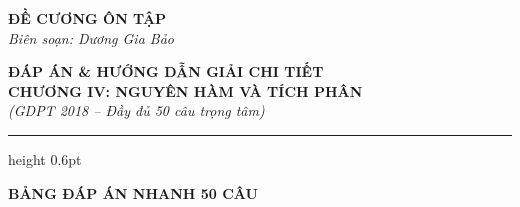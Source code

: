 \documentclass[12pt,a4paper]{article}
\begin{document}
\thispagestyle{firstpage}

\noindent
\begin{minipage}[t]{0.36\textwidth}
    \centering
    {\fontsize{12}{14}\selectfont\textbf{ĐỀ CƯƠNG ÔN TẬP}}\\[4pt]
    \textit{Biên soạn: Dương Gia Bảo}\\[6pt]
    \setlength{\fboxrule}{0.8pt}
    \setlength{\fboxsep}{5pt}
\end{minipage}\hfill
\begin{minipage}[t]{0.62\textwidth}
    \centering
    {\fontsize{13}{15}\selectfont\textbf{ĐÁP ÁN \& HƯỚNG DẪN GIẢI CHI TIẾT}}\\[3pt]
    {\fontsize{12}{14}\selectfont\textbf{CHƯƠNG IV: NGUYÊN HÀM VÀ TÍCH PHÂN}}\\[3pt]
    {\fontsize{11}{13}\selectfont\textit{(GDPT 2018 -- Đầy đủ 50 câu trọng tâm)}}
\end{minipage}

\par\vspace{4pt}
\hrule height 0.6pt
\vspace{8pt}

\begin{center}
    {\fontsize{13}{15}\selectfont\textbf{BẢNG ĐÁP ÁN NHANH 50 CÂU}}
\end{center}
\end{document}
